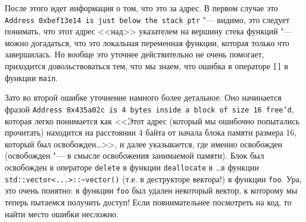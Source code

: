 \documentclass[a4paper,10pt]{problems}
\begin{document}
После этого идет информация о том, что это за адрес. В первом случае это \verb`Address 0xbef13e14 is just below the stack ptr` "---
видимо, это следует понимать, что этот адрес <<над>> указателем на вершину стека функций "--- можно догадаться, что это локальная переменная
функции, которая только что завершилась. Но вообще это уточнее действительно не очень помогает, приходится довольствоваться тем, что мы знаем, что
ошибка в операторе \verb`[]` в функции \verb`main`.

Зато во второй ошибке уточнение намного более детальное. Оно начинается фразой \texttt{Address 0x435a02c is 4 bytes inside a block of size 16 free'd},
которая легко понимается как <<Этот адрес (который мы ошибочно попытались прочитать) находится на расстоянии 4 байта от начала блока памяти размера 16,
который был освобожден\dots>>, и далее указывается, где именно освобожден (освобожден "--- в смысле освобожения занимаемой памяти). 
Блок был освобожден в операторе \verb`delete` в функции \verb`deallocate` в \dots в функции \verb`std::vector<...>::~vector()` (т.е. в деструкторе вектора!)
в функции \verb`foo`. 
Ура, это очень понятно: в функции \verb`foo` был удален некоторый вектор, к которому мы теперь пытаемся получить доступ! 
Если повнимательнее посмотреть на код, то найти место ошибки несложно.
\end{document}
